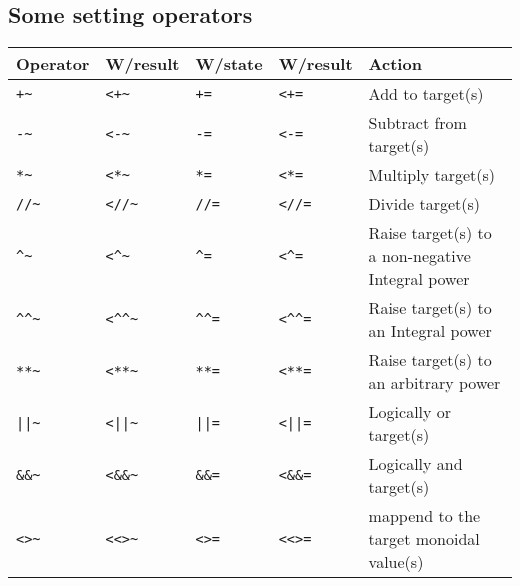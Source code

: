 \begin{box2}
\subsection *{Some setting operators}
\begin{tabular}{ l l l l l }
\textbf{Operator}             &  \textbf{W/result}  &  \textbf{W/state}  &  \textbf{W/result}  &  \textbf{Action}\\
\hline
\verb!+~ !                    &  \verb!<+~ !        &  \verb!+= !        &  \verb!<+= !        &  Add to target(s)\\
\verb!-~ !                    &  \verb!<-~ !        &  \verb!-= !        &  \verb!<-= !        &  Subtract from target(s)\\
\verb!*~ !                    &  \verb!<*~ !        &  \verb!*= !        &  \verb!<*= !        &  Multiply target(s)\\
\verb!//~!                    &  \verb!<//~!        &  \verb!//=!        &  \verb!<//=!        &  Divide target(s)\\
\verb!^~ !                    &  \verb!<^~ !        &  \verb!^= !        &  \verb!<^= !        &  Raise target(s) to a non-negative Integral power\\
\verb!^^~!                    &  \verb!<^^~!        &  \verb!^^=!        &  \verb!<^^=!        &  Raise target(s) to an Integral power\\
\verb!**~!                    &  \verb!<**~!        &  \verb!**=!        &  \verb!<**=!        &  Raise target(s) to an arbitrary power\\
\verb!||~!                    &  \verb!<||~!        &  \verb!||=!        &  \verb!<||=!        &  Logically or target(s)\\
\verb!&&~!                    &  \verb!<&&~!        &  \verb!&&=!        &  \verb!<&&=!        &  Logically and target(s)\\
\verb!<>~!                    &  \verb!<<>~!        &  \verb!<>=!        &  \verb!<<>=!        &  mappend to the target monoidal value(s)\\
\end{tabular}
\end{box2}



